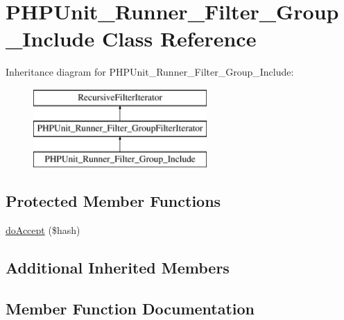 \hypertarget{class_p_h_p_unit___runner___filter___group___include}{}\section{P\+H\+P\+Unit\+\_\+\+Runner\+\_\+\+Filter\+\_\+\+Group\+\_\+\+Include Class Reference}
\label{class_p_h_p_unit___runner___filter___group___include}
Inheritance diagram for P\+H\+P\+Unit\+\_\+\+Runner\+\_\+\+Filter\+\_\+\+Group\+\_\+\+Include\+:\begin{figure}[H]
\begin{center}
\leavevmode
\includegraphics[height=3.000000cm]{class_p_h_p_unit___runner___filter___group___include}
\end{center}
\end{figure}
\subsection*{Protected Member Functions}
\begin{DoxyCompactItemize}
\item 
\mbox{\hyperlink{class_p_h_p_unit___runner___filter___group___include_acbbdccc716fb8365bbb7282b6851cc19}{do\+Accept}} (\$hash)
\end{DoxyCompactItemize}
\subsection*{Additional Inherited Members}


\subsection{Member Function Documentation}
\mbox{\label{class_p_h_p_unit___runner___filter___group___include_acbbdccc716fb8365bbb7282b6851cc19}} 
